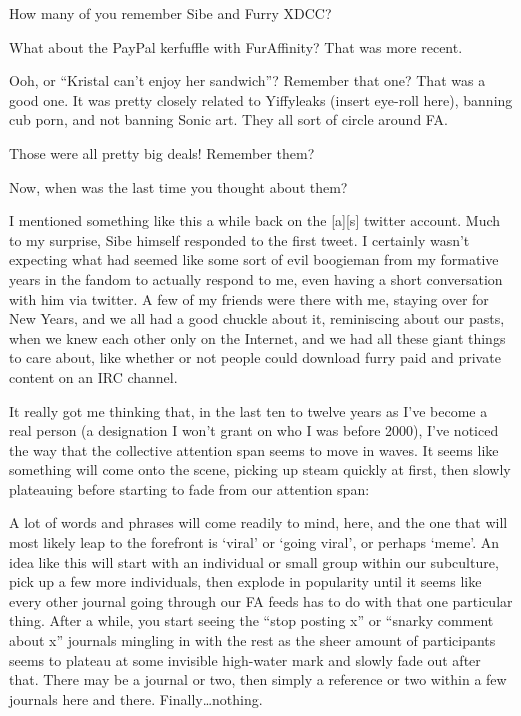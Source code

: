 How many of you remember Sibe and Furry XDCC?

What about the PayPal kerfuffle with FurAffinity? That was more recent.

Ooh, or ``Kristal can't enjoy her sandwich''? Remember that one? That was a good one. It was pretty closely related to Yiffyleaks (insert eye-roll here), banning cub porn, and not banning Sonic art. They all sort of circle around FA.

Those were all pretty big deals! Remember them?

Now, when was the last time you thought about them?

I mentioned something like this a while back on the {[}a{]}{[}s{]} twitter account. Much to my surprise, Sibe himself responded to the first tweet. I certainly wasn't expecting what had seemed like some sort of evil boogieman from my formative years in the fandom to actually respond to me, even having a short conversation with him via twitter. A few of my friends were there with me, staying over for New Years, and we all had a good chuckle about it, reminiscing about our pasts, when we knew each other only on the Internet, and we had all these giant things to care about, like whether or not people could download furry paid and private content on an IRC channel.

It really got me thinking that, in the last ten to twelve years as I've become a real person (a designation I won't grant on who I was before 2000), I've noticed the way that the collective attention span seems to move in waves. It seems like something will come onto the scene, picking up steam quickly at first, then slowly plateauing before starting to fade from our attention span:

A lot of words and phrases will come readily to mind, here, and the one that will most likely leap to the forefront is `viral' or `going viral', or perhaps `meme'. An idea like this will start with an individual or small group within our subculture, pick up a few more individuals, then explode in popularity until it seems like every other journal going through our FA feeds has to do with that one particular thing. After a while, you start seeing the ``stop posting x'' or ``snarky comment about x'' journals mingling in with the rest as the sheer amount of participants seems to plateau at some invisible high-water mark and slowly fade out after that. There may be a journal or two, then simply a reference or two within a few journals here and there. Finally\ldots{}nothing.

